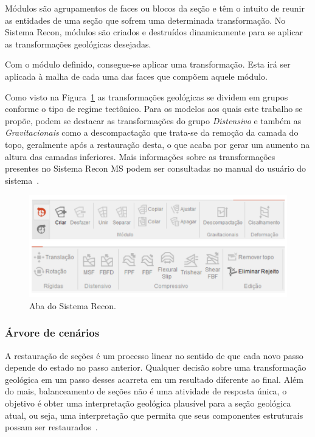 Módulos são agrupamentos de faces ou blocos da seção e têm o intuito de reunir as entidades de uma seção que sofrem uma determinada transformação. No Sistema Recon, módulos são criados e destruídos dinamicamente para se aplicar as transformações geológicas desejadas.

Com o módulo definido, consegue-se aplicar uma transformação. Esta irá ser aplicada à malha de cada uma das faces que compõem aquele módulo.

Como visto na Figura~\ref{fig-recon-5} as transformações geológicas se dividem em grupos conforme o tipo de regime tectônico. Para os modelos aos quais este trabalho se propõe, podem se destacar as transformações do grupo \emph{Distensivo} e também as \emph{Gravitacionais} como a descompactação que trata-se da remoção da camada do topo, geralmente após a restauração desta, o que acaba por gerar um aumento na altura das camadas inferiores. Mais informações sobre as transformações presentes no Sistema Recon MS podem ser consultadas no manual do usuário do sistema~\cite{Recon}.

\begin{figure} [H]
  \begin{center}
    \includegraphics[width=\textwidth]{images/fig-recon-5}
    \caption{Aba  do Sistema Recon.}\label{fig-recon-5}
  \end{center}
\end{figure}

\subsubsection{Árvore de cenários}

A restauração de seções é um processo linear no sentido de que cada novo passo depende do estado no passo anterior. Qualquer decisão sobre uma transformação geológica em um passo desses acarreta em um resultado diferente ao final. Além do mais, balanceamento de seções não é uma atividade de resposta única, o objetivo é obter uma interpretação geológica plausível para a seção geológica atual, ou seja, uma interpretação que permita que seus componentes estruturais possam ser restaurados~\cite{Fossen}. 

